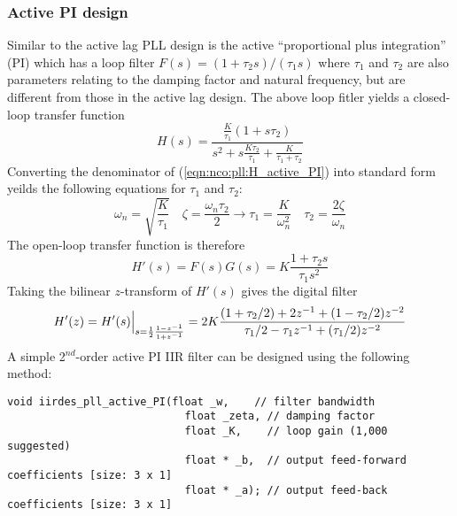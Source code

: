 \subsubsection{Active PI design}
\label{module:nco:pll:active_PI}
Similar to the active lag PLL design is the
active ``proportional plus integration'' (PI)
which has a loop filter
$F(s) = (1 + \tau_2 s)/(\tau_1 s)$
where $\tau_1$ and $\tau_2$ are also parameters relating to the damping
factor and natural frequency,
but are different from those in the active lag design.
The above loop fitler yields a closed-loop transfer function
%
\begin{equation}
\label{eqn:nco:pll:H_active_PI}
    H(s) = \frac{
                \frac{K}{\tau_1} (1 + s\tau_2)
           } {
                s^2 + s\frac{K\tau_2}{\tau_1} + \frac{K}{\tau_1 + \tau_2}
           }
\end{equation}
%
Converting the denominator of (\ref{eqn:nco:pll:H_active_PI}) into
standard form yeilds the following equations for $\tau_1$ and $\tau_2$:
%
\begin{equation}
    \omega_n = \sqrt{\frac{K}{\tau_1}}
    \,\,\,\,\,\,
    \zeta = \frac{\omega_n \tau_2}{2}
        \rightarrow
    \tau_1 = \frac{K}{\omega_n^2}
    \,\,\,\,\,\,
    \tau_2 = \frac{2\zeta}{\omega_n}
\end{equation}
%
The open-loop transfer function is therefore
%
\begin{equation}
    H'(s) = F(s)G(s) = K \frac{1 + \tau_2 s}{\tau_1 s^2}
\end{equation}
%
Taking the bilinear $z$-transform of $H'(s)$ gives the digital filter
%
\begin{equation}
    H'(z) = H'(s)\Bigl.\Bigr|_{s = \frac{1}{2}\frac{1-z^{-1}}{1+z^{-1}}}
          = 2 K \frac{
                (1+\tau_2/2) + 2 z^{-1}     + ( 1 - \tau_2/2)z^{-2}
          } {
                \tau_1/2 -\tau_1 z^{-1} + (\tau_1/2)z^{-2}
          }
\end{equation}
%
A simple 2$^{nd}$-order active PI IIR filter can be designed using the
following method:
%
\begin{Verbatim}[fontsize=\small]
  void iirdes_pll_active_PI(float _w,    // filter bandwidth
                            float _zeta, // damping factor
                            float _K,    // loop gain (1,000 suggested)
                            float * _b,  // output feed-forward coefficients [size: 3 x 1]
                            float * _a); // output feed-back coefficients [size: 3 x 1]
\end{Verbatim}
%



